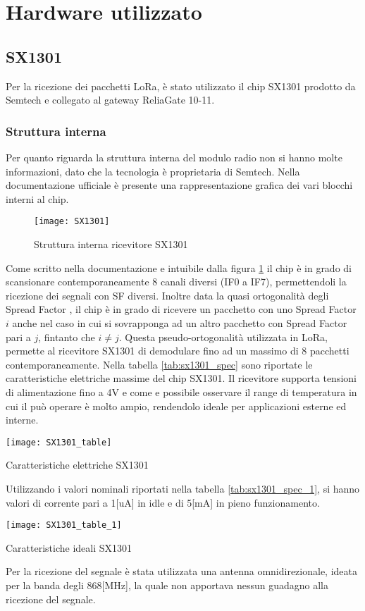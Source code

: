 \section{Hardware utilizzato}

\subsection{SX1301}
Per la ricezione dei pacchetti LoRa, è stato utilizzato il chip SX1301 prodotto
da Semtech e collegato al gateway ReliaGate 10-11.
\subsubsection{Struttura interna}
Per quanto riguarda la struttura interna del modulo radio non si hanno molte
informazioni, dato che la tecnologia è proprietaria di Semtech. Nella
documentazione ufficiale è presente una rappresentazione grafica dei vari
blocchi interni al chip.

\begin{figure}[th]
        \centering 
                \texttt{[image: SX1301]}
        \caption{Struttura interna ricevitore SX1301}
        \label{fig:sx1301}
\end{figure}

Come scritto nella documentazione \cite{sx1301_doc} e intuibile dalla
figura \ref{fig:sx1301} il chip è in grado di scansionare contemporaneamente 
8 canali diversi (IF0 a IF7),  permettendoli la ricezione dei segnali con SF diversi.
Inoltre data la quasi ortogonalità degli Spread Factor
, il chip è in grado di ricevere un pacchetto
con uno Spread Factor $i$ anche nel caso in cui si sovrapponga ad un altro
pacchetto con Spread Factor pari a $j$, fintanto che $i\neq j$. Questa
pseudo-ortogonalità utilizzata in LoRa, permette al ricevitore  SX1301 
di demodulare fino ad un massimo di 8 pacchetti contemporaneamente.
Nella tabella \ref{tab:sx1301_spec} sono riportate le caratteristiche elettriche
massime del  chip SX1301. Il ricevitore supporta tensioni di
alimentazione fino a 4V e  come e possibile osservare il range di temperatura in cui il
può operare è molto ampio, rendendolo ideale per applicazioni esterne ed
interne. 

\begin{table}[th]
        \centering 
                \texttt{[image: SX1301\_table]}
        \caption{Caratteristiche elettriche SX1301}
\label{tab:sx1301_spec}
\end{table}
Utilizzando i valori nominali riportati nella tabella \ref{tab:sx1301_spec_1},
si hanno valori di corrente pari a 1[uA] in idle  e di 5[mA] in pieno
funzionamento.
\begin{table}[th]
        \centering 
                \texttt{[image: SX1301\_table\_1]}
        \caption{Caratteristiche ideali SX1301 }
        \label{tab:sx1301_spec_1}
\end{table}
Per la ricezione del segnale è stata utilizzata una antenna omnidirezionale,
ideata per la banda degli 868[MHz], la quale non apportava nessun guadagno alla
ricezione del segnale.
